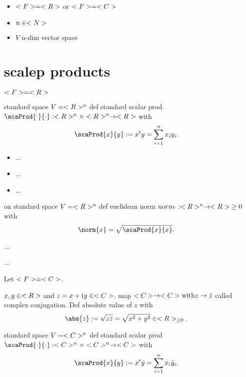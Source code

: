 \begin{itemize}
	\item $<F> = <R>$ or $<F> = <C>$
	\item $n \in <N>$
	\item $V$ n-dim vector space
\end{itemize}
\section{scalep products}
$<F> = <R>$
\begin{definition}
	standard space $V = <R>^n$ def standard scalar prod. $\scaProd{\cdot}{\cdot}: \Rn \times \Rn \to \R$ with
	\begin{align*}
		\scaProd{x}{y} := x^t y = \sum_{i=1}^n x_i y_i.
	\end{align*}
\end{definition}
\begin{proposition}
	\begin{itemize}
		\item ...
		\item ...
		\item ...
	\end{itemize}
\end{proposition}
\begin{definition}
	on standard space $V = <R>^n$ def euclidean norm $norm{\cdot}: <R>^n \to <R>{\ge 0}$ with
	\begin{align*}
		\norm{x} = \sqrt{\scaProd{x}{x}}.
	\end{align*}
\end{definition}
\begin{proposition}[CSU]
	...
\end{proposition}
\begin{proposition}
	...
\end{proposition}
Let $<F> = <C>$.
\begin{definition}
	$x,y \in <R>$ and $z = x+\mathrm{i}\mkern1mu y \in <C>$. map $<C> \to <C> \text{with} z \to \bar{z}$ called complex conjugation. Def absolute value of $z$ with
	\begin{align*}
		\abs{z} := \sqrt{z\bar{z}} = \sqrt{x^2+y^2} \in \R_{\ge 0}.
	\end{align*}
\end{definition}
\begin{definition}
	standard space $V=<C>^n$ def standard scalar prod $\scaProd{\cdot}{\cdot}: \C^n \times \C^n \to \C$ with
	\begin{align*}
		\scaProd{x}{y} := x^t \bar{y} = \sum_{i=1}^n x_i \bar{y}_i.
	\end{align*}
\end{definition}
